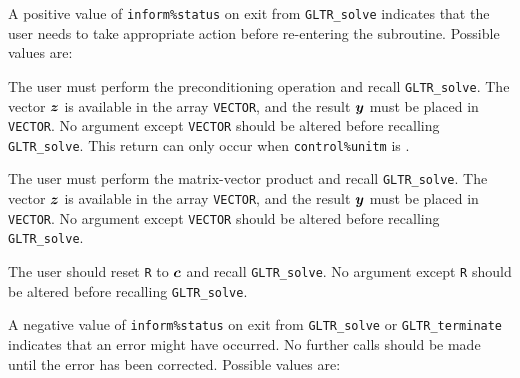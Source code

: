 \documentclass{galahad}
\newcommand{\packagename}{GL\-TR}
\begin{document}

\galreverse
A positive value of {\tt inform\%status} on exit from
{\tt \packagename\_solve} indicates that the user needs to take appropriate
action before re-entering the subroutine. Possible values are:

\begin{description}

 The user must perform the preconditioning operation
and recall {\tt \packagename\_solve}.
The vector ${\bm{z}}$ is available in the array {\tt VECTOR}, and the result
${\bm{y}}$ must be placed in {\tt VECTOR}.
No argument except {\tt VECTOR} should be altered before recalling
{\tt \packagename\_solve}. This return can only occur when
{\tt control\%unitm} is \false.

 The user must perform the matrix-vector product
\disp{\bmy := \bmH \bmz}
and recall {\tt \packagename\_solve}.
The vector ${\bm{z}}$ is available in the array {\tt VECTOR}, and the result
${\bm{y}}$ must be placed in {\tt VECTOR}.
No argument except {\tt VECTOR} should be altered before recalling
{\tt \packagename\_solve}.

 The user should reset {\tt R} to ${\bm{c}}$ and recall
{\tt \packagename\_solve}.
No argument except {\tt R} should be altered before recalling
{\tt \packagename\_solve}.
\end{description}


\galerrors
A negative value of  {\tt inform\%status} on exit from
{\tt \packagename\_solve}
or
{\tt \packagename\_terminate}
indicates that an error might have occurred. No further calls should be made
until the error has been corrected. Possible values are:
\end{document}
